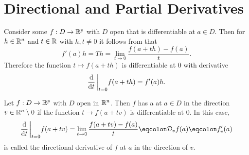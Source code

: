\documentclass[../main.tex]{subfiles}
\begin{document}
\section[Derivatives II]{Directional and Partial Derivatives}

Consider some $f : D \to \mathbb{R}^p$ with $D$ open that is differentiable at $a \in D$. Then for $h \in \mathbb{R}^n$ and $t \in \mathbb{R}$ with $h, t \neq 0$ it follows from  that
\[
    f'(a) h = Th = \lim_{t \to 0} \frac{f(a + th) - f(a)}{t}
.\]
Therefore the function $t \mapsto f(a+th)$ is differentiable at $0$ with derivative
\[
    \dv{t} \eval_{t=0} f(a+th) = f'(a) h
.\]

\begin{definition}
    Let $f : D \to \mathbb{R}^p$ with $D$ open in $\mathbb{R}^n$. Then $f$ has a  at $a \in D$ in the direction $v \in \mathbb{R}^n \setminus{0}$ if the function $t \to f(a + tv)$ is differentiable at $0$. In this case,
    \[
        \dv{t} \eval_{t=0} f(a+tv) = \lim_{t \to 0} \frac{f(a+tv) - f(a)}{t} \eqcolon \mathcal{D}_{v} f(a) \eqcolon f'_{v}(a)
    \]
    is called the directional derivative of $f$ at $a$ in the direction of $v$.
\end{definition}
\end{document}
